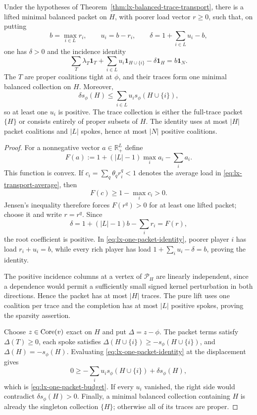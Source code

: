 \begin{theorem}
\label{thm:lx-one-packet-obstruction}
Under the hypotheses of
Theorem~\ref{thm:lx-balanced-trace-transport}, there is a lifted minimal
balanced packet on $H$, with poorer load vector $r\geq0$, such that, on
putting
\[
 b=\max_{i\in L}r_i,\qquad u_i=b-r_i,\qquad
 \delta=1+\sum_{i\in L}u_i-b,
\]
one has $\delta>0$ and the incidence identity
\[
 \sum_T\lambda_T\mathbf1_T
 +\sum_{i\in L}u_i\mathbf1_{H\cup\{i\}}
 -\delta\mathbf1_H=b\mathbf1_N.                    \tag{OP-1}
 \label{eq:lx-one-packet-identity}
\]
The $T$ are proper coalitions tight at $\phi$, and their traces form one
minimal balanced collection on $H$.  Moreover,
\[
 \delta s_\phi(H)
 \leq\sum_{i\in L}u_i s_\phi(H\cup\{i\}),           \tag{OP-2}
 \label{eq:lx-one-packet-budget}
\]
so at least one $u_i$ is positive.  The trace collection is either the
full-trace packet $\{H\}$ or consists entirely of proper subsets of $H$.
The identity uses at most $|H|$ packet coalitions and $|L|$ spokes, hence at
most $|N|$ positive coalitions.
\end{theorem}

\begin{proof}
For a nonnegative vector $a\in\mathbb R_+^L$ define
\[
 F(a):=1+(|L|-1)\max_i a_i-\sum_i a_i.
\]
This function is convex.  If $c_i=\sum_q\theta_qr_i^q<1$ denotes the average
load in
\eqref{eq:lx-transport-average}, then
\[
 F(c)\geq1-\max_i c_i>0.
\]
Jensen's inequality therefore forces $F(r^q)>0$ for at least one lifted
packet; choose it and write $r=r^q$.  Since
\[
 \delta=1+(|L|-1)b-\sum_i r_i=F(r),
\]
the root coefficient is positive.  In
\eqref{eq:lx-one-packet-identity}, poorer player $i$ has load
$r_i+u_i=b$, while every rich player has load
$1+\sum_i u_i-\delta=b$, proving the identity.

The positive incidence columns at a vertex of $\mathcal P_H$ are linearly
independent, since a dependence would permit a sufficiently small signed
kernel perturbation in both directions.  Hence the packet has at most $|H|$
traces.  The pure lift uses one coalition per trace and the completion has at
most $|L|$ positive spokes, proving the sparsity assertion.

Choose $z\in\operatorname{Core}(v)$ exact on $H$ and put $\Delta=z-\phi$.  The packet
terms satisfy $\Delta(T)\geq0$, each spoke satisfies
$\Delta(H\cup\{i\})\geq-s_\phi(H\cup\{i\})$, and
$\Delta(H)=-s_\phi(H)$.  Evaluating
\eqref{eq:lx-one-packet-identity} at the displacement gives
\[
 0\geq-\sum_i u_i s_\phi(H\cup\{i\})
        +\delta s_\phi(H),
\]
which is
\eqref{eq:lx-one-packet-budget}.  If every $u_i$ vanished, the right side
would contradict $\delta s_\phi(H)>0$.  Finally, a minimal balanced
collection containing $H$ is already the singleton collection $\{H\}$;
otherwise all of its traces are proper.
\end{proof}

